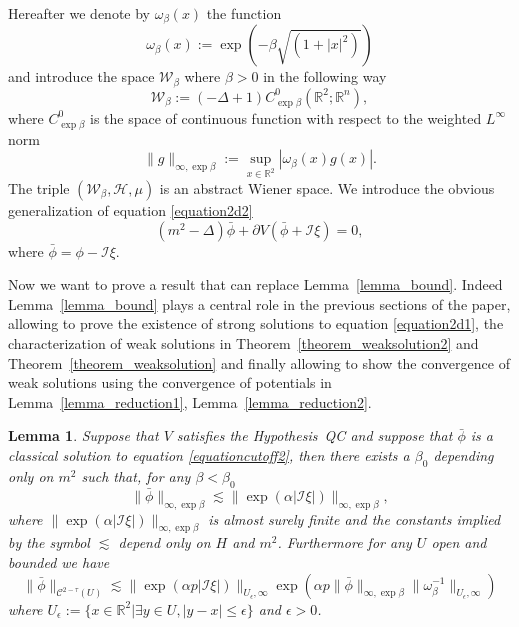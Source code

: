 \documentclass[a4paper,10pt]{article}
\newcommand{\assign}{:=}
\newtheorem{lemma}{Lemma}
\begin{document}
Hereafter we denote by $\omega_{\beta} (x)$ the function
\[ \omega_{\beta} (x) \assign \exp (- \beta \sqrt{(1 + | x |^2)}) \]
and introduce the space $\mathcal{W}_{\beta}$ where $\beta > 0$ in the
following way
\[ \mathcal{W}_{\beta} \assign (- \Delta + 1) C^0_{\exp \beta} (\mathbb{R}^2 ;
   \mathbb{R}^n), \]
where $C^0_{\exp \beta}$ is the space of continuous function with respect to
the weighted $L^{\infty}$ norm
\[ \| g \|_{\infty, \exp \beta} \assign \sup_{x \in \mathbb{R}^2} |
   \omega_{\beta} (x) g (x) | . \]
The triple $(\mathcal{W}_{\beta}, \mathcal{H}, \mu)$ is an abstract Wiener
space. We introduce the obvious generalization of equation
{\eqref{equation2d2}}
\begin{equation}
  (m^2 - \Delta) \bar{\phi} + \partial V (\bar{\phi} +\mathcal{I} \xi) = 0,
  \label{equationcutoff2}
\end{equation}
where $\bar{\phi} = \phi -\mathcal{I} \xi .$

Now we want to prove a result that can replace Lemma~\ref{lemma_bound}.
Indeed Lemma~\ref{lemma_bound} plays a central role in the previous sections
of the paper, allowing to prove the existence of strong solutions to equation
{\eqref{equation2d1}}, the characterization of weak solutions in
Theorem~\ref{theorem_weaksolution2} and Theorem~\ref{theorem_weaksolution} and
finally allowing to show the convergence of weak solutions using the
convergence of potentials in Lemma~\ref{lemma_reduction1},
Lemma~\ref{lemma_reduction2}.

\begin{lemma}
  \label{lemma_existencecutoff}Suppose that $V$ satisfies the Hypothesis~QC
  and suppose that $\bar{\phi}$ is a classical solution to equation
  {\eqref{equationcutoff2}}, then there exists a $\beta_0$ depending only on
  $m^2$ such that, for any $\beta < \beta_0$
  \begin{equation}
    \| \bar{\phi} \|_{\infty, \exp \beta} \lesssim \| \exp (\alpha |
    \mathcal{I} \xi |) \|_{\infty, \exp \beta}, \label{equationweight1}
  \end{equation}
  where $\| \exp (\alpha | \mathcal{I} \xi |) \|_{\infty, \exp \beta}$ is
  almost surely finite and the constants implied by the symbol $\lesssim$
  depend only on $H$ and $m^2$. Furthermore for any $U$ open and bounded we
  have
  \begin{equation}
    \| \bar{\phi} \|_{\mathcal{C}^{2 - \tau} (U)} \lesssim \| \exp (\alpha p |
    \mathcal{I} \xi |) \|_{U_{\epsilon}, \infty} \exp (\alpha p \| \bar{\phi}
    \|_{\infty, \exp \beta} \| \omega_{\beta}^{- 1} \|_{U_{\epsilon}, \infty})
    \label{equationweight2}
  \end{equation}
  where $U_{\epsilon} \assign \{ x \in \mathbb{R}^2 | \exists y \in U, | y - x
  | \leqslant \epsilon \}$ and $\epsilon > 0$.
\end{lemma}
\end{document}
